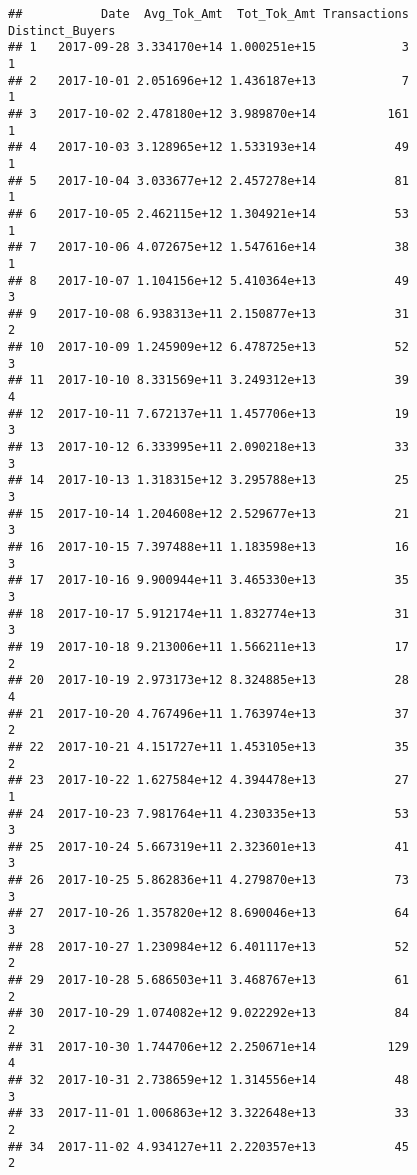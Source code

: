 \documentclass[]{article}
\begin{document}
\begin{verbatim}
##           Date  Avg_Tok_Amt  Tot_Tok_Amt Transactions Distinct_Buyers
## 1   2017-09-28 3.334170e+14 1.000251e+15            3               1
## 2   2017-10-01 2.051696e+12 1.436187e+13            7               1
## 3   2017-10-02 2.478180e+12 3.989870e+14          161               1
## 4   2017-10-03 3.128965e+12 1.533193e+14           49               1
## 5   2017-10-04 3.033677e+12 2.457278e+14           81               1
## 6   2017-10-05 2.462115e+12 1.304921e+14           53               1
## 7   2017-10-06 4.072675e+12 1.547616e+14           38               1
## 8   2017-10-07 1.104156e+12 5.410364e+13           49               3
## 9   2017-10-08 6.938313e+11 2.150877e+13           31               2
## 10  2017-10-09 1.245909e+12 6.478725e+13           52               3
## 11  2017-10-10 8.331569e+11 3.249312e+13           39               4
## 12  2017-10-11 7.672137e+11 1.457706e+13           19               3
## 13  2017-10-12 6.333995e+11 2.090218e+13           33               3
## 14  2017-10-13 1.318315e+12 3.295788e+13           25               3
## 15  2017-10-14 1.204608e+12 2.529677e+13           21               3
## 16  2017-10-15 7.397488e+11 1.183598e+13           16               3
## 17  2017-10-16 9.900944e+11 3.465330e+13           35               3
## 18  2017-10-17 5.912174e+11 1.832774e+13           31               3
## 19  2017-10-18 9.213006e+11 1.566211e+13           17               2
## 20  2017-10-19 2.973173e+12 8.324885e+13           28               4
## 21  2017-10-20 4.767496e+11 1.763974e+13           37               2
## 22  2017-10-21 4.151727e+11 1.453105e+13           35               2
## 23  2017-10-22 1.627584e+12 4.394478e+13           27               1
## 24  2017-10-23 7.981764e+11 4.230335e+13           53               3
## 25  2017-10-24 5.667319e+11 2.323601e+13           41               3
## 26  2017-10-25 5.862836e+11 4.279870e+13           73               3
## 27  2017-10-26 1.357820e+12 8.690046e+13           64               3
## 28  2017-10-27 1.230984e+12 6.401117e+13           52               2
## 29  2017-10-28 5.686503e+11 3.468767e+13           61               2
## 30  2017-10-29 1.074082e+12 9.022292e+13           84               2
## 31  2017-10-30 1.744706e+12 2.250671e+14          129               4
## 32  2017-10-31 2.738659e+12 1.314556e+14           48               3
## 33  2017-11-01 1.006863e+12 3.322648e+13           33               2
## 34  2017-11-02 4.934127e+11 2.220357e+13           45               2

\end{verbatim}
\end{document}

